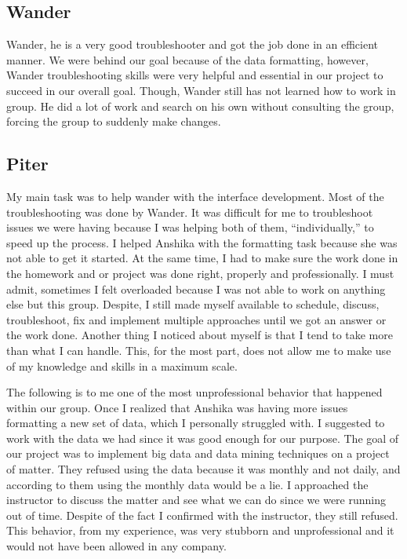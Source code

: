 \documentclass{sig-alternate}
\begin{document}
	\subsection{Wander}\normalfont \normalsize{
		Wander, he is a very good troubleshooter and got the job done in an efficient manner. We were behind our goal because of the data formatting, however, Wander troubleshooting skills were very helpful and essential in our project to succeed in our overall goal. Though, Wander still has not learned how to work in group. He did a lot of work and search on his own without consulting the group, forcing the group to suddenly make changes.\newline }

	\subsection{Piter}\normalfont \normalsize{
		My main task was to help wander with the interface development. Most of the troubleshooting was done by Wander. It was difficult for me to troubleshoot issues we were having because I was helping both of them, $“$individually,$”$ to speed up the process. I helped Anshika with the formatting task because she was not able to get it started. At the same time, I had to make sure the work done in the homework and or project was done right, properly and professionally. I must admit, sometimes I felt overloaded because I was not able to work on anything else but this group. Despite, I still made myself available to schedule, discuss, troubleshoot, fix and implement multiple approaches until we got an answer or the work done. Another thing I noticed about myself is that I tend to take more than what I can handle. This, for the most part, does not allow me to make use of my knowledge and skills in a maximum scale.\newline}
		
		\normalfont \normalsize{The following is to me one of the most unprofessional behavior that happened within our group. Once I realized that Anshika was having more issues formatting a new set of data, which I personally struggled with. I suggested to work with the data we had since it was good enough for our purpose. The goal of our project was to implement big data and data mining techniques on a project of matter. They refused using the data because it was monthly and not daily, and according to them using the monthly data would be a lie. I approached the instructor to discuss the matter and see what we can do since we were running out of time. Despite of the fact I confirmed with the instructor, they still refused. This behavior, from my experience, was very stubborn and unprofessional and it would not have been allowed in any company.\newline}
		
\end{document}
